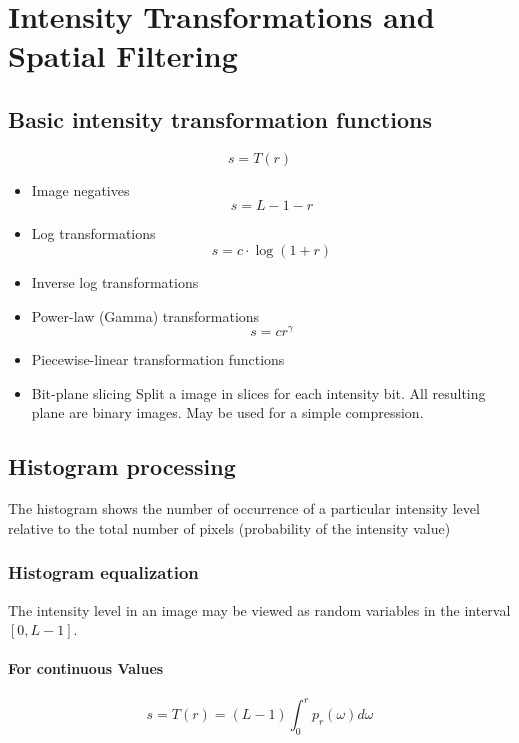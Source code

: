 \section{Intensity Transformations and Spatial Filtering  }

\subsection{Basic intensity transformation functions }
\begin{equation}
s = T(r)
\end{equation}

\begin{itemize}
	\item Image negatives
		\begin{equation}
			s = L-1-r
		\end{equation}
	\item Log transformations
		\begin{equation}
			s = c \cdot \log{(1 + r)}
		\end{equation}
	\item Inverse log transformations
	\item Power-law (Gamma) transformations
		\begin{equation}
			s = c r^\gamma
		\end{equation}
	\item Piecewise-linear transformation functions
	\item Bit-plane slicing
		Split a image in slices for each intensity bit.  All resulting plane are binary images.
		May be used for a simple compression.
	
\end{itemize}


\subsection{Histogram processing }
The histogram shows the number of occurrence of a particular intensity level relative to the total number of pixels (probability of the intensity value)

\subsubsection{Histogram equalization }
The intensity level in an image may be viewed as random variables in the interval $[0, L-1]$.

\paragraph{For continuous Values}
\begin{equation}
	s = T(r) = (L-1)\int_0^r p_r(\omega) d\omega
\end{equation} 

